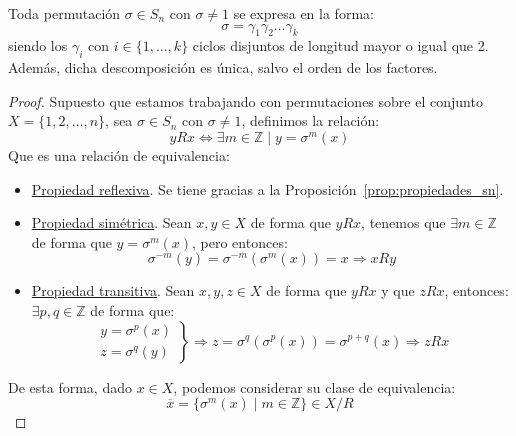\begin{teo}\label{teo:ciclos_disjuntos}
    Toda permutación $\sigma\in S_n$ con $\sigma\neq 1$ se expresa en la forma:
    \begin{equation*}
        \sigma = \gamma_1\gamma_2 \ldots \gamma_k
    \end{equation*}
    siendo los $\gamma_i$ con $i \in \{1,\ldots,k\}$ ciclos disjuntos de longitud mayor o igual que 2. Además, dicha descomposición es única, salvo el orden de los factores.
    \begin{proof}
        Supuesto que estamos trabajando con permutaciones sobre el conjunto $X=\{1,2,\ldots,n\}$, sea $\sigma\in S_n$ con $\sigma\neq 1$, definimos la relación:
        \begin{equation*}
            yRx \Longleftrightarrow \exists m\in \mathbb{Z} \mid y = \sigma^m(x)
        \end{equation*}
        Que es una relación de equivalencia:
        \begin{itemize}
            \item \underline{Propiedad reflexiva}. Se tiene gracias a la Proposición~\ref{prop:propiedades_sn}.
            \item \underline{Propiedad simétrica}. Sean $x,y\in X$ de forma que $yRx$, tenemos que $\exists m\in \mathbb{Z}$ de forma que $y=\sigma^m(x)$, pero entonces:
                \begin{equation*}
                    \sigma^{-m}(y) = \sigma^{-m}(\sigma^{m}(x)) = x \Longrightarrow xRy
                \end{equation*}
            \item \underline{Propiedad transitiva}. Sean $x,y,z\in X$ de forma que $yRx$ y que $zRx$, entonces: $\exists p,q\in \mathbb{Z}$ de forma que:
                \begin{equation*}
                    \left.\begin{array}{r}
                        y = \sigma^p(x) \\
                        z = \sigma^q(y)
                    \end{array}\right\} \Longrightarrow z = \sigma^q(\sigma^p(x)) = \sigma^{p+q}(x) \Longrightarrow zRx
                \end{equation*}
        \end{itemize}
        De esta forma, dado $x\in X$, podemos considerar su clase de equivalencia:
        \begin{equation*}
            \overline{x} = \{\sigma^{m}(x) \mid m\in \mathbb{Z}\} \in X/R

\end{equation*}
\end{proof}
\end{teo}
